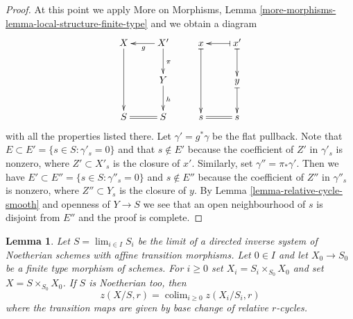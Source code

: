 \documentclass{stacks-project}
\theoremstyle{plain}
\newtheorem{lemma}[subsection]{Lemma}
\theoremstyle{definition}
\theoremstyle{remark}
\numberwithin{equation}{subsection}
\def\lim{\mathop{\mathrm{lim}}\nolimits}
\def\colim{\mathop{\mathrm{colim}}\nolimits}
\begin{document}
\begin{proof}
\medskip\noindent
At this point we apply More on Morphisms, Lemma
\ref{more-morphisms-lemma-local-structure-finite-type}
and we obtain a diagram
$$
\xymatrix{
X \ar[dd] & X' \ar[l]^g \ar[d]^\pi & x \ar@{|->}[dd] &
x' \ar@{|->}[l]  \ar@{|->}[d] \\
& Y \ar[d]^h & & y \ar@{|->}[d] \\
S \ar@{=}[r] & S & s & s \ar@{=}[l]
}
$$
with all the properties listed there. Let $\gamma' = g^*\gamma$
be the flat pullback. Note that $E \subset E' = \{s \in S: \gamma'_s = 0\}$
and that $s \not \in E'$ because the coefficient of $Z'$ in $\gamma'_s$
is nonzero, where $Z' \subset X'_s$ is the closure of $x'$.
Similarly, set $\gamma'' = \pi_*\gamma'$. Then we have
$E' \subset E'' = \{s \in S: \gamma''_s = 0\}$ and $s \not \in E''$
because the coefficient of $Z''$ in $\gamma''_s$ is nonzero, where
$Z'' \subset Y_s$ is the closure of $y$. By
Lemma \ref{lemma-relative-cycle-smooth} and openness of $Y \to S$
we see that an open neighbourhood of $s$ is disjoint from $E''$
and the proof is complete.
\end{proof}

\begin{lemma}
\label{lemma-descend-through-limit}
Let $S = \lim_{i \in I} S_i$ be the limit of a directed inverse system of
Noetherian schemes with affine transition morphisms.
Let $0 \in I$ and let $X_0 \to S_0$ be a finite type morphism of schemes.
For $i \geq 0$ set $X_i = S_i \times_{S_0} X_0$ and set
$X = S \times_{S_0} X_0$. If $S$ is Noetherian too, then
$$
z(X/S, r) = \colim_{i \geq 0} z(X_i/S_i, r)
$$
where the transition maps are given by base change of relative
$r$-cycles.
\end{lemma}
\end{document}
